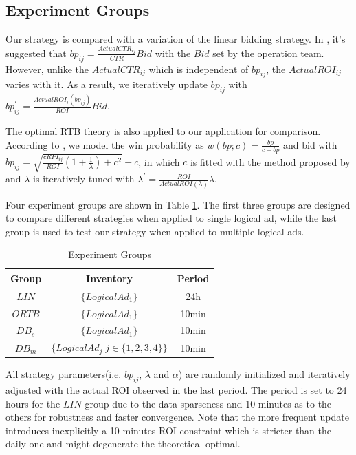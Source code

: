 \documentclass{article}
\newcommand{\sbp}{bp_{ij}}
\newcommand{\sCPI}{RPI_{ij}}
\newcommand{\ortbbp}{\sqrt{\frac{c\sCPI}{ROI}(1+\frac{1}{\lambda})+c^2}-c}
\newcommand{\liniter}{\sbp^{'}=\frac{ActualROI_i(\sbp)}{ROI}Bid}
\newcommand{\ortbiter}{\lambda^{'}=\frac{ROI}{ActualROI(\lambda)}\lambda}
\begin{document}
\subsection{Experiment Groups}

Our strategy is compared with a variation of the linear bidding strategy.
In \cite{M6D}, it's suggested that $\sbp=\frac{ActualCTR_{ij}}{CTR}Bid$ with the $Bid$ set by the operation team.
However, unlike the $ActualCTR_{ij}$ which is independent of $\sbp$, the $ActualROI_{ij}$ varies with it.
As a result, we iteratively update $\sbp$ with $\liniter$.

The optimal RTB theory is also applied to our application for comparison.
According to \cite{WeinanZhang2014}, we model the win probability as $w(bp;c)=\frac{bp}{c+bp}$ and bid with $\sbp=\ortbbp$,
    in which $c$ is fitted with the method proposed by \cite{Wu2015} and $\lambda$ is iteratively tuned with $\ortbiter$.

Four experiment groups are shown in Table \ref{TableExperimentGroups}.
The first three groups are designed to compare different strategies when applied to single logical ad,
    while the last group is used to test our strategy when applied to multiple logical ads.

\begin{table}
\caption{Experiment Groups\label{TableExperimentGroups}}
\begin{center}
\begin{tabular}{c|c|c}
\textbf{Group}    & \textbf{Inventory}         & \textbf{Period} \\
\hline
\hline
$LIN$    & $\{LogicalAd_1\}$                   & 24h \\
$ORTB$   & $\{LogicalAd_1\}$                   & 10min \\
$DB_{s}$ & $\{LogicalAd_1\}$                   & 10min \\
$DB_{m}$ & $\{LogicalAd_j|j \in \{1,2,3,4\}\}$ & 10min \\
\end{tabular}
\end{center}
\end{table}

All strategy parameters(i.e. $\sbp$, $\lambda$ and $\alpha$) are randomly initialized and
    iteratively adjusted with the actual ROI observed in the last period.
The period is set to 24 hours for the $LIN$ group due to the data sparseness
    and 10 minutes as to the others for robustness and faster convergence.
Note that the more frequent update introduces inexplicitly a 10 minutes ROI constraint
    which is stricter than the daily one and might degenerate the theoretical optimal.
\end{document}
